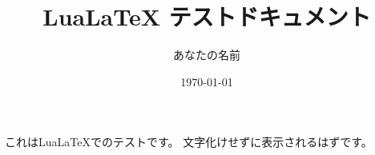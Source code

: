 \documentclass{ltjsarticle}
\title{LuaLaTeX テストドキュメント}
\author{あなたの名前}
\date{\today}
\begin{document}
\maketitle

これはLuaLaTeXでのテストです。
文字化けせずに表示されるはずです。
\end{document}
